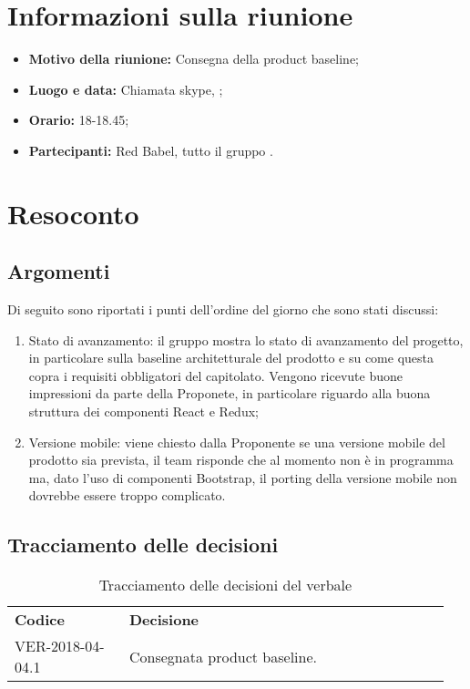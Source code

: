 \documentclass[VER-AAAA-MM-GG.tex]{subfiles}
\begin{document}
\chapter{Informazioni sulla riunione}
\begin{itemize}
	\item \textbf{Motivo della riunione:} Consegna della product baseline;
	\item \textbf{Luogo e data:} Chiamata skype, ;
	\item \textbf{Orario:} 18-18.45;
	\item \textbf{Partecipanti:} Red Babel, tutto il gruppo \gruppo.
\end{itemize}



\chapter{Resoconto}
\section{Argomenti}
Di seguito sono riportati i punti dell'ordine del giorno che sono stati discussi:
\begin{enumerate}
	\item {Stato di avanzamento:} il gruppo \gruppo mostra lo stato di avanzamento del progetto, in particolare sulla baseline architetturale del prodotto e su come questa copra i requisiti obbligatori del capitolato. Vengono ricevute buone impressioni da parte della Proponete, in particolare riguardo alla buona struttura dei componenti React e Redux;
	\item {Versione mobile:} viene chiesto dalla Proponente se una versione mobile del prodotto sia prevista, il team risponde che al momento non è in programma ma, dato l'uso di componenti Bootstrap, il porting della versione mobile non dovrebbe essere troppo complicato.
\end{enumerate}
\section{Tracciamento delle decisioni}
\begin{table}[H]
	\begin{center}
		\begin{tabu} to 
			\tableHeaderStyle
			\textbf{Codice} & \textbf{Decisione} \\
			VER-2018-04-04.1 & Consegnata product baseline. \\
		\end{tabu}
		\caption{Tracciamento delle decisioni del verbale}
	\end{center}
\end{table}
\end{document}
